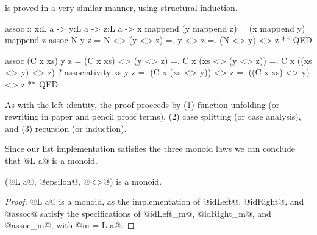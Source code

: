 is proved in a very similar manner,
using structural induction.
%
\begin{code}
  assoc :: x:L a -> y:L a -> z:L a -> {x mappend (y mappend z) = (x mappend y) mappend z}
  assoc N y z
    =  N <> (y <> z)
    =. y <> z
    =. (N <> y) <> z
    ** QED

  assoc (C x xs) y z
    =  (C x xs) <> (y <> z)
    =. C x (xs <> (y <> z))
    =. C x ((xs <> y) <> z) ? associativity xs y z
    =. (C x (xs <> y)) <> z
    =. ((C x xs) <> y) <> z
    ** QED
 \end{code}
%
As with the left identity, the proof proceeds by
(1) function unfolding (or rewriting in paper and pencil proof terms),
(2) case splitting (or case analysis), and
(3) recursion (or induction).

Since our list implementation satisfies the three monoid laws
we can conclude that @L a@ is a monoid.
%


\begin{theorem}\label{theorem:monoid:list}
(@L a@, @epsilon@, @<>@) is a monoid.
\end{theorem}
\begin{proof}
@L a@ is a monoid, as the implementation of
@idLeft@, @idRight@, and @assoc@
satisfy the specifications of
@idLeft_m@, @idRight_m@, and @assoc_m@, with @m = L a@.
\cqed\end{proof}
